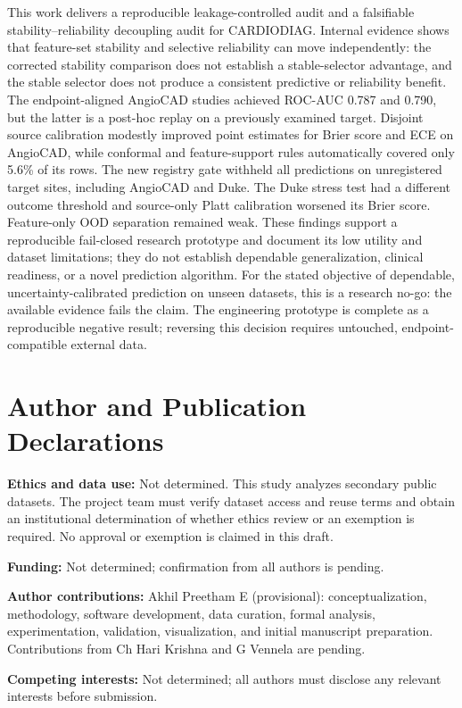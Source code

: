 \documentclass[12pt]{article}
\begin{document}
This work delivers a reproducible leakage-controlled audit and a falsifiable
stability--reliability decoupling audit for CARDIODIAG. Internal evidence shows
that feature-set stability and selective reliability can move independently:
the corrected stability comparison does not establish a stable-selector
advantage, and the stable selector does not produce a consistent predictive or
reliability benefit.
The endpoint-aligned AngioCAD studies achieved ROC-AUC 0.787 and 0.790, but
the latter is a post-hoc replay on a previously examined target. Disjoint
source calibration modestly improved point estimates for Brier score and ECE
on AngioCAD, while conformal and feature-support rules automatically covered
only 5.6\% of its rows. The new registry gate withheld all predictions on
unregistered target sites, including AngioCAD and Duke. The Duke stress test
had a different outcome threshold and source-only Platt calibration worsened
its Brier score. Feature-only OOD separation remained weak. These findings
support a reproducible fail-closed research prototype and document its low
utility and dataset limitations; they do not establish dependable
generalization, clinical readiness, or a novel prediction algorithm.
For the stated objective of dependable, uncertainty-calibrated prediction on
unseen datasets, this is a research no-go: the available evidence fails the
claim. The engineering prototype is complete as a reproducible negative result;
reversing this decision requires untouched, endpoint-compatible external data.

\section*{Author and Publication Declarations}
\textbf{Ethics and data use:} Not determined. This study analyzes secondary
public datasets. The project team must verify dataset access and reuse terms
and obtain an institutional determination of whether ethics review or an
exemption is required. No approval or exemption is claimed in this draft.

\textbf{Funding:} Not determined; confirmation from all authors is pending.

\textbf{Author contributions:} Akhil Preetham E (provisional):
conceptualization, methodology, software development, data curation, formal
analysis, experimentation, validation, visualization, and initial manuscript
preparation. Contributions from Ch Hari Krishna and G Vennela are pending.

\textbf{Competing interests:} Not determined; all authors must disclose any
relevant interests before submission.
\end{document}
